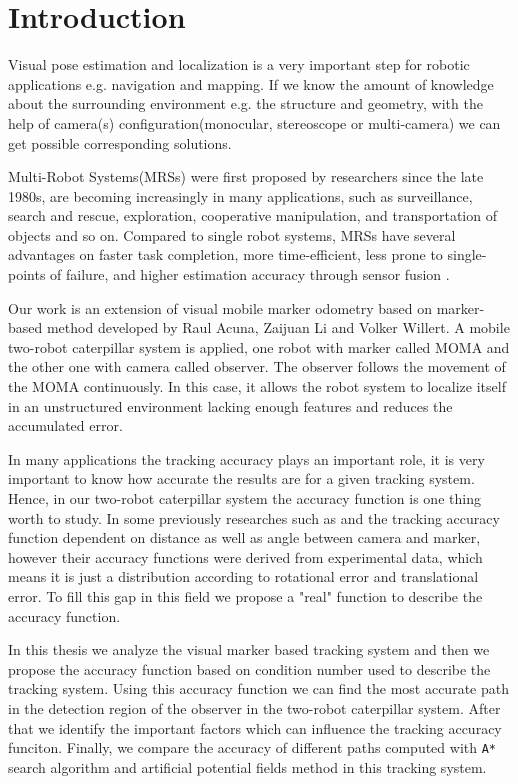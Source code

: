 \chapter{Introduction}
\label{chap:Introduction}

Visual pose estimation and localization is a very important step for robotic applications e.g. navigation and mapping. If we know the amount of knowledge about the surrounding environment e.g. the structure and geometry, with the help of camera(s) configuration(monocular, stereoscope or multi-camera) we can get possible corresponding solutions.

Multi-Robot Systems(MRSs) were first proposed by researchers since the late 1980s, are becoming increasingly in many applications, such as surveillance, search and rescue, exploration, cooperative manipulation, and transportation of objects and so on\cite{darmanin2017review}. Compared to single robot systems, MRSs have several advantages on faster task completion, more time-efficient, less prone to single-points of failure, and higher estimation accuracy through sensor fusion\cite{darmanin2017review} \cite{wang2014vision}.

Our work is an extension of visual mobile marker odometry based on marker-based method developed by Raul Acuna, Zaijuan Li and Volker Willert\cite{acuna2017moma}. A mobile two-robot caterpillar system is applied, one robot with marker called MOMA and the other one with camera called observer. The observer follows the movement of the MOMA continuously. In this case, it allows the robot system to localize itself in an unstructured environment lacking enough features and reduces the accumulated error.

In many applications the tracking accuracy plays an important role, it is very important to know how accurate the results are for a given tracking system. Hence, in our two-robot caterpillar system the accuracy function is one thing worth to study. In some previously researches such as \cite{abawi2004accuracy} and \cite{pentenrieder2006analysis} the tracking accuracy function dependent on distance as well as angle between camera and marker, however their accuracy functions were derived from experimental data, which means it is just a distribution according to rotational error and translational error. To fill this gap in this field we propose a "real" function to describe the accuracy function.

In this thesis we analyze the visual marker based tracking system and then we propose the accuracy function based on condition number used to describe the tracking system. Using this accuracy function we can find the most accurate path in the detection region of the observer in the two-robot caterpillar system. After that we identify the important factors which can influence the tracking accuracy funciton. Finally, we compare the accuracy of different paths computed with \texttt{A*} search algorithm and artificial potential fields method in this tracking system.  
